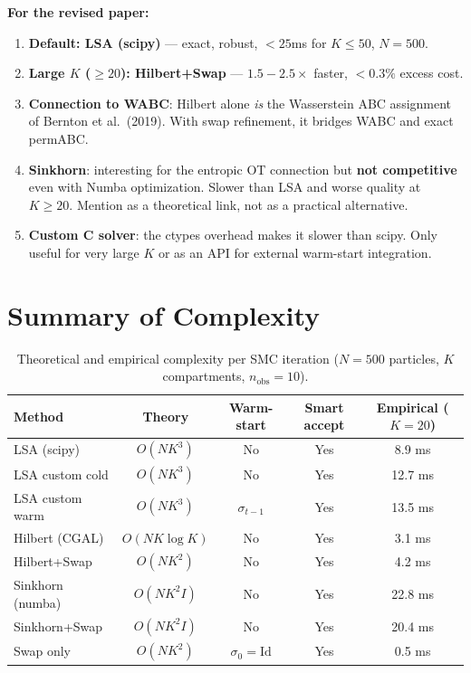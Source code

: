 \documentclass[11pt,a4paper]{article}
\begin{document}
\textbf{For the revised paper:}
\begin{enumerate}
  \item \textbf{Default: LSA (scipy)} --- exact, robust, $< 25$ms for $K \le 50$, $N=500$.
  \item \textbf{Large $K$ ($\ge 20$): Hilbert+Swap} --- $1.5{-}2.5\times$ faster, $<0.3\%$ excess cost.
  \item \textbf{Connection to WABC}: Hilbert alone \emph{is} the Wasserstein ABC assignment of Bernton et al.\ (2019). With swap refinement, it bridges WABC and exact permABC.
  \item \textbf{Sinkhorn}: interesting for the entropic OT connection but \textbf{not competitive} even with Numba optimization. Slower than LSA and worse quality at $K \ge 20$. Mention as a theoretical link, not as a practical alternative.
  \item \textbf{Custom C solver}: the ctypes overhead makes it slower than scipy. Only useful for very large $K$ or as an API for external warm-start integration.
\end{enumerate}

\section{Summary of Complexity}

\begin{table}[h!]
\centering
\caption{Theoretical and empirical complexity per SMC iteration ($N=500$ particles, $K$ compartments, $n_{\text{obs}}=10$).}
\label{tab:complexity}
\begin{tabular}{lcccc}
\toprule
Method & Theory & Warm-start & Smart accept & Empirical ($K=20$) \\
\midrule
LSA (scipy)      & $O(NK^3)$       & No              & Yes & 8.9 ms \\
LSA custom cold  & $O(NK^3)$       & No              & Yes & 12.7 ms \\
LSA custom warm  & $O(NK^3)$       & $\sigma_{t-1}$  & Yes & 13.5 ms \\
Hilbert (CGAL)   & $O(NK\log K)$   & No              & Yes & 3.1 ms \\
Hilbert+Swap     & $O(NK^2)$       & No              & Yes & 4.2 ms \\
Sinkhorn (numba) & $O(NK^2 I)$     & No              & Yes & 22.8 ms \\
Sinkhorn+Swap    & $O(NK^2 I)$     & No              & Yes & 20.4 ms \\
Swap only        & $O(NK^2)$       & $\sigma_0=\text{Id}$ & Yes & 0.5 ms \\
\bottomrule
\end{tabular}
\end{table}
\end{document}
